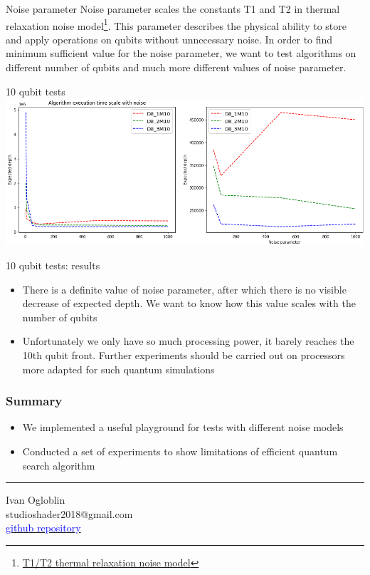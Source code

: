 \documentclass[14pt,aspectratio=169,hyperref={pdftex,unicode},xcolor=dvipsnames]{beamer}
\begin{document}
\begin{frame}{Noise parameter}
	Noise parameter scales the constants T1 and T2 in thermal relaxation noise model\footnote{\href{https://arxiv.org/pdf/2101.02109.pdf}{T1/T2 thermal relaxation noise model}}. This parameter describes the physical ability to store and apply operations on qubits without unnecessary noise. In order to find minimum sufficient value for the noise parameter, we want to test algorithms on different number of qubits and much more different values of noise parameter. 
\end{frame}

\begin{frame}{10 qubit tests}
	 \includegraphics[width=14cm]{images/10_qubit_tests.png}
\end{frame}

\begin{frame}{10 qubit tests: results}
	\begin{itemize}
		\item There is a definite value of noise parameter, after which there is no visible decrease of expected depth. We want to know how this value scales with the number of qubits
		\item Unfortunately we only have so much processing power, it barely reaches the 10th qubit front. Further experiments should be carried out on processors more adapted for such quantum simulations
	\end{itemize}
\end{frame}

\begin{frame}
\frametitle{Summary}

\begin{itemize}
\item We implemented a useful playground for tests with different noise models
\item Conducted a set of experiments to show limitations of efficient quantum search algorithm
\end{itemize}

\vspace{5mm}\hrule\vspace{5mm}

\begin{center}
Ivan Ogloblin\\
studioshader2018@gmail.com \\
\href{https://github.com/StudioShader/QPSA}{\textcolor{blue}{github repository}}
\end{center}

\end{frame}
\end{document}
